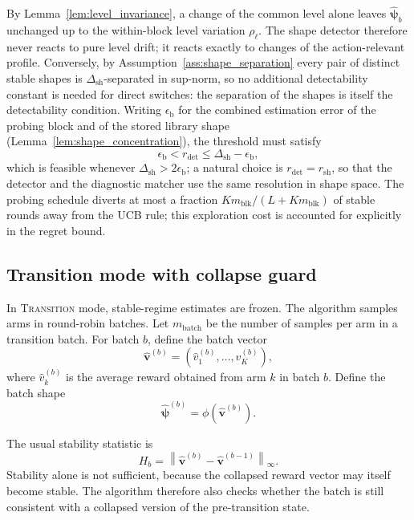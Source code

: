 \documentclass[11pt]{article}
\newcommand{\norm}[1]{\left\lVert #1 \right\rVert}
\begin{document}
By Lemma~\ref{lem:level_invariance}, a change of the common level alone leaves $\widehat{\bm\psi}_{b}$ unchanged up to the within-block level variation $\rho_{\ell}$. The shape detector therefore never reacts to pure level drift; it reacts exactly to changes of the action-relevant profile. Conversely, by Assumption~\ref{ass:shape_separation} every pair of distinct stable shapes is $\Delta_{\mathrm{sh}}$-separated in sup-norm, so no additional detectability constant is needed for direct switches: the separation of the shapes is itself the detectability condition. Writing $\epsilon_{\mathrm{b}}$ for the combined estimation error of the probing block and of the stored library shape (Lemma~\ref{lem:shape_concentration}), the threshold must satisfy
\begin{equation}
\label{eq:r_det_window}
\epsilon_{\mathrm{b}}
<
r_{\mathrm{det}}
\leq
\Delta_{\mathrm{sh}}-\epsilon_{\mathrm{b}},
\end{equation}
which is feasible whenever $\Delta_{\mathrm{sh}}>2\epsilon_{\mathrm{b}}$; a natural choice is $r_{\mathrm{det}}=r_{\mathrm{sh}}$, so that the detector and the diagnostic matcher use the same resolution in shape space. The probing schedule diverts at most a fraction $Km_{\mathrm{blk}}/(L+Km_{\mathrm{blk}})$ of stable rounds away from the UCB rule; this exploration cost is accounted for explicitly in the regret bound.

\subsection{Transition mode with collapse guard}
\label{subsec:transition_mode}

In \textsc{Transition} mode, stable-regime estimates are frozen. The algorithm samples arms in round-robin batches. Let $m_{\mathrm{batch}}$ be the number of samples per arm in a transition batch. For batch $b$, define the batch vector
\begin{equation}
\label{eq:transition_batch_vector}
\widehat{\bm v}^{(b)}
=
(\widehat v_1^{(b)},\ldots,\widehat v_K^{(b)}),
\end{equation}
where $\widehat v_k^{(b)}$ is the average reward obtained from arm $k$ in batch $b$. Define the batch shape
\begin{equation}
\label{eq:transition_batch_shape}
\widehat{\bm\psi}^{(b)}
=
\phi(\widehat{\bm v}^{(b)}).
\end{equation}

The usual stability statistic is
\begin{equation}
\label{eq:stability_statistic}
H_b
=
\norm{\widehat{\bm v}^{(b)}-\widehat{\bm v}^{(b-1)}}_{\infty}.
\end{equation}
Stability alone is not sufficient, because the collapsed reward vector may itself become stable. The algorithm therefore also checks whether the batch is still consistent with a collapsed version of the pre-transition state.
\end{document}
